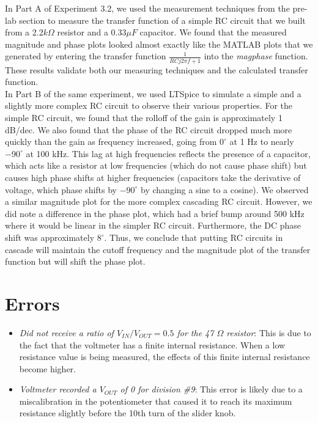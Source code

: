 \documentclass[10pt]{article}
\begin{document}
In Part A of Experiment 3.2, we used the measurement techniques from the pre-lab section to measure the transfer function of a simple RC circuit that we built from a 2.2$k\Omega$ resistor and a 0.33$\mu F$ capacitor. We found that the measured magnitude and phase plots looked almost exactly like the MATLAB plots that we generated by entering the transfer function $\frac{1}{RCj2\pi f+1}$ into the \textit{magphase} function. These results validate both our  measuring techniques and the calculated transfer function. \\ In Part B of the same experiment, we used LTSpice to simulate a simple and a slightly more complex RC circuit to observe their various properties. For the simple RC circuit, we found that the rolloff of the gain is approximately 1 dB/dec. We also found that the phase of the RC circuit dropped much more quickly than the gain as frequency increased, going from $0^\circ$ at 1 Hz to nearly $-90^\circ$ at 100 kHz. This lag at high frequencies reflects the presence of a capacitor, which acts like a resistor at low frequencies (which do not cause phase shift) but causes high phase shifts at higher frequencies (capacitors take the derivative of voltage, which phase shifts by $-90^\circ$ by changing a sine to a cosine). We observed a similar magnitude plot for the more complex cascading RC circuit. However, we did note a difference in the phase plot, which had a brief bump around 500 kHz where it would be linear in the simpler RC circuit. Furthermore, the DC phase shift was approximately $8^\circ$. Thus, we conclude that putting RC circuits in cascade will maintain the cutoff frequency and the magnitude plot of the transfer function but will shift the phase plot. 


\section{Errors}
\begin{itemize}
	\item \textit{Did not receive a ratio of $V_{IN}/V_{OUT}=0.5$ for the 47 $\Omega$ resistor}: This is due to the fact that the voltmeter has a finite internal resistance. When a low resistance value is being measured, the effects of this finite internal resistance become higher. 
	\item \textit{Voltmeter recorded a $V_{OUT}$ of 0 for division \#9}: This error is likely due to a miscalibration in the potentiometer that caused it to reach its maximum resistance slightly before the 10th turn of the slider knob. 
\end{itemize}

\medskip

\end{document}
